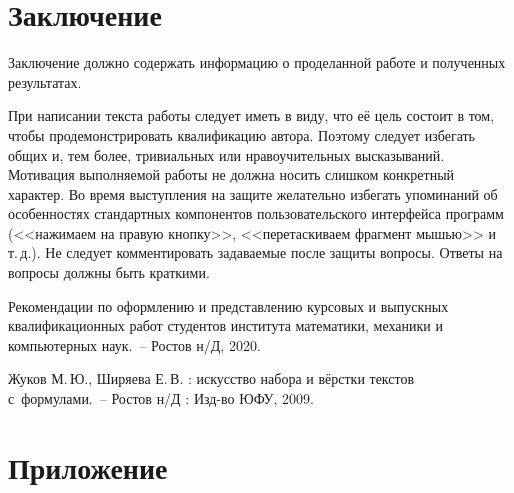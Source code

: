 \documentclass[14pt]{mmcs_article}
\begin{document}
\newpage
{}
\section*{Заключение}

Заключение должно содержать информацию о проделанной работе и полученных результатах.

При написании текста работы следует иметь в виду, что её цель состоит в том, чтобы продемонстрировать квалификацию автора. Поэтому следует избегать общих и, тем более, тривиальных или нравоучительных высказываний. Мотивация выполняемой работы не должна носить слишком конкретный характер. Во время выступления на защите желательно избегать упоминаний об особенностях стандартных компонентов пользовательского интерфейса программ (<<нажимаем на правую кнопку>>, <<перетаскиваем фрагмент мышью>> и т.\,д.). Не следует комментировать задаваемые после защиты вопросы. Ответы на вопросы должны быть краткими.



\newpage

\renewcommand{\refname}{\centering \textbf{Литература}}

\begin{thebibliography}{0}
Рекомендации по оформлению
и представлению курсовых
и выпускных квалификационных работ
студентов института математики,
механики и компьютерных наук.~--
Ростов н/Д, 2020.

Жуков М.\,Ю., Ширяева Е.\,В.
\LaTeXe: искусство набора и вёрстки текстов с~формулами.~-- Ростов н/Д : Изд-во ЮФУ, 2009.
\end{thebibliography}

\newpage

\section*{Приложение}
\end{document}
